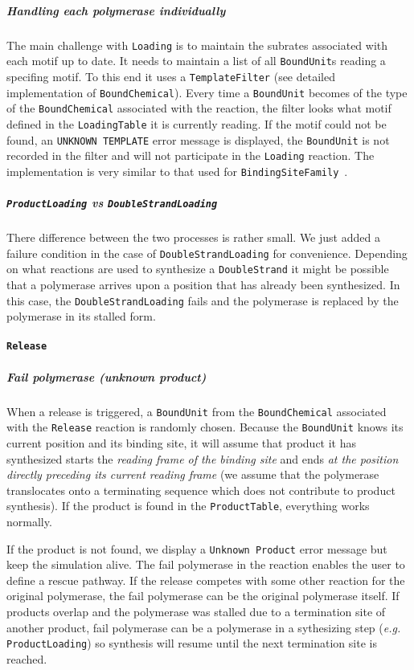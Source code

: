 \subparagraph{Handling each polymerase individually} The main challenge with \texttt{Loading} is to maintain the subrates associated with each motif up to date. It needs to maintain a list of all \texttt{BoundUnit}s reading a specifing motif. To this end it uses a \texttt{TemplateFilter} (see detailed implementation of \texttt{BoundChemical}). Every time a \texttt{BoundUnit} becomes of the type of the \texttt{BoundChemical} associated with the reaction, the filter looks what motif defined in the \texttt{LoadingTable} it is currently reading. If the motif could not be found, an \texttt{UNKNOWN TEMPLATE} error message is displayed, the \texttt{BoundUnit} is not recorded in the filter and will not participate in the \texttt{Loading} reaction. The implementation is very similar to that used for \texttt{BindingSiteFamily}~.

\subparagraph{\texttt{ProductLoading} vs \texttt{DoubleStrandLoading}} There difference between the two processes is rather small. We just added a failure condition in the case of \texttt{DoubleStrandLoading} for convenience. Depending on what reactions are used to synthesize a \texttt{DoubleStrand} it might be possible that a polymerase arrives upon a position that has already been synthesized. In this case, the \texttt{DoubleStrandLoading} fails and the polymerase is replaced by the polymerase in its stalled form.

\paragraph{\texttt{Release}}

\subparagraph{Fail polymerase (unknown product)} When a release is triggered, a \texttt{BoundUnit} from the \texttt{BoundChemical} associated with the \texttt{Release} reaction is randomly chosen. Because the \texttt{BoundUnit} knows its current position and its binding site, it will assume that product it has synthesized starts the \emph{reading frame of the binding site} and ends \emph{at the position directly preceding its current reading frame} (we assume that the polymerase translocates onto a terminating sequence which does not contribute to product synthesis). If the product is found in the \texttt{ProductTable}, everything works normally. 

If the product is not found, we display a \texttt{Unknown Product} error message but keep the simulation alive. The fail polymerase in the reaction enables the user to define a rescue pathway. If the release competes with some other reaction for the original polymerase, the fail polymerase can be the original polymerase itself. If products overlap and the polymerase was stalled due to a termination site of another product, fail polymerase can be a polymerase in a sythesizing step (\textit{e.g.} \texttt{ProductLoading}) so synthesis will resume until the next termination site is reached.

